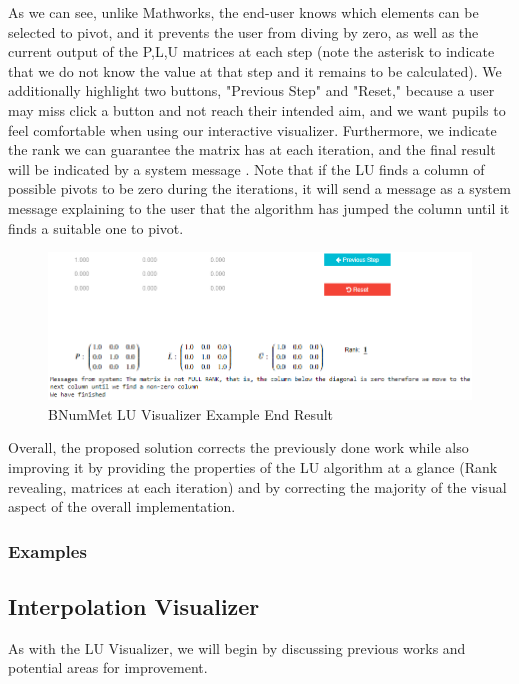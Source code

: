 As we can see, unlike Mathworks, the end-user knows which elements can be selected to pivot, and it prevents the user from diving by zero, as well as the current output of the P,L,U matrices at each step (note the asterisk to indicate that we do not know the value at that step and it remains to be calculated). We additionally highlight two buttons, "Previous Step" and "Reset," because a user may miss click a button and not reach their intended aim, and we want pupils to feel comfortable when using our interactive visualizer.
Furthermore, we indicate the rank we can guarantee the matrix has at each iteration, and the final result will be indicated by a system message . Note that if the LU finds a column of possible pivots to be zero during the iterations, it will send a message as a system message explaining to the user that the algorithm has jumped the column until it finds a suitable one to pivot.

\begin{figure}[H]
    \centering
    \includegraphics[width=\textwidth]{Include/Images/Thesis/Development/Visualizers/LU VISUALIZER/BNumMet.LU.Ex1.1.png}
    \caption{BNumMet LU Visualizer Example End Result}
    \label{fig:BNumMet Example End Result}
\end{figure}

Overall, the proposed solution corrects the previously done work while also improving it by providing the properties of the LU algorithm at a glance (Rank revealing, matrices at each iteration) and by correcting the majority of the visual aspect of the overall implementation.

\subsubsection{Examples}
	

\subsection{Interpolation Visualizer}
As with the LU Visualizer, we will begin by discussing previous works and potential areas for improvement.

